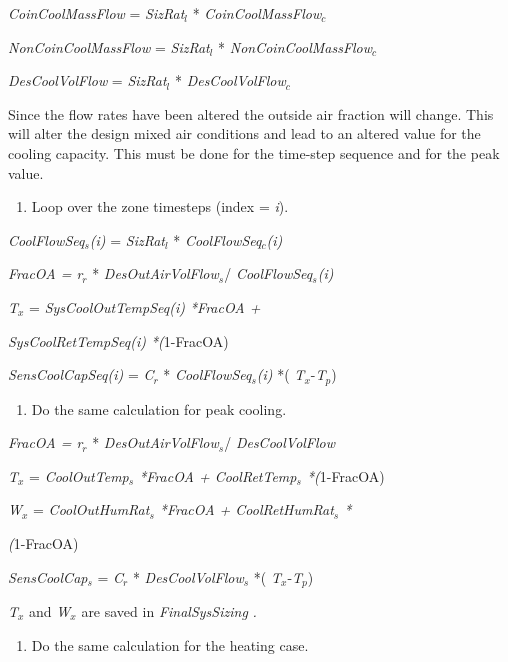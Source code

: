 \emph{CoinCoolMassFlow} = \emph{SizRat\(_{l}\)} * \emph{CoinCoolMassFlow\(_{c}\)}

\emph{NonCoinCoolMassFlow} = \emph{SizRat\(_{l}\)} * \emph{NonCoinCoolMassFlow\(_{c}\)}

\emph{DesCoolVolFlow} = \emph{SizRat\(_{l}\)} * \emph{DesCoolVolFlow\(_{c}\)}

Since the flow rates have been altered the outside air fraction will change. This will alter the design mixed air conditions and lead to an altered value for the cooling capacity. This must be done for the time-step sequence and for the peak value.

\begin{enumerate}
\def\labelenumi{(\roman{enumi})}
\setcounter{enumi}{1}
\tightlist
\item
  Loop over the zone timesteps (index = \emph{i}).
\end{enumerate}

\emph{CoolFlowSeq\(_{s}\)(i)} = \emph{SizRat\(_{l}\)} * \emph{CoolFlowSeq\(_{c}\)(i)}

\emph{FracOA = r\(_{r}\)} * \emph{DesOutAirVolFlow\(_{s}\)}/ \emph{CoolFlowSeq\(_{s}\)(i)}

\emph{T\(_{x}\)} = \emph{SysCoolOutTempSeq(i) *FracOA +}

\emph{SysCoolRetTempSeq(i) *(}1-FracOA)

\emph{SensCoolCapSeq(i)} = \emph{C\(_{r}\)} * \emph{CoolFlowSeq\(_{s}\)(i)} *( \emph{T\(_{x}\)}-\emph{T\(_{p}\)})

\begin{enumerate}
\def\labelenumi{(\roman{enumi})}
\setcounter{enumi}{2}
\tightlist
\item
  Do the same calculation for peak cooling.
\end{enumerate}

\emph{FracOA = r\(_{r}\)} * \emph{DesOutAirVolFlow\(_{s}\)}/ \emph{DesCoolVolFlow}

\emph{T\(_{x}\)} = \emph{CoolOutTemp\(_{s}\) *FracOA + CoolRetTemp\(_{s}\) *(}1-FracOA)

\emph{W\(_{x}\)} = \emph{CoolOutHumRat\(_{s}\) *FracOA + CoolRetHumRat\(_{s}\) *}

\emph{(}1-FracOA)

\emph{SensCoolCap\(_{s}\)} = \emph{C\(_{r}\)} * \emph{DesCoolVolFlow\(_{s}\)} *( \emph{T\(_{x}\)}-\emph{T\(_{p}\)})

\emph{T\(_{x}\)} and \emph{W\(_{x}\)} are saved in \emph{FinalSysSizing} \emph{.}

\begin{enumerate}
\def\labelenumi{(\roman{enumi})}
\setcounter{enumi}{3}
\tightlist
\item
  Do the same calculation for the heating case.
\end{enumerate}

